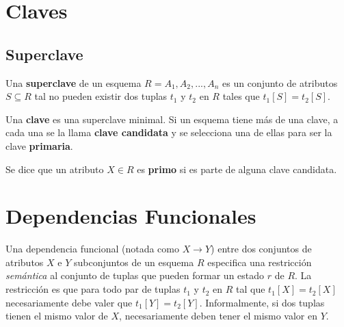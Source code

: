 \documentclass[]{article}
\begin{document}






\section{Claves}
\subsection{Superclave}
Una \textbf{superclave} de un esquema $R = {A_1, A_2, ..., A_n}$ es un conjunto de atributos $S\subseteq R$ tal no pueden existir dos tuplas $t_1$ y $t_2$ en $R$ tales que $t_1[S] = t_2[S]$.

Una \textbf{clave} es una superclave minimal. Si un esquema tiene más de una clave, a cada una se la llama \textbf{clave candidata} y se selecciona una de ellas para ser la clave \textbf{primaria}.

Se dice que un atributo $X \in R$ es \textbf{primo} si es parte de alguna clave candidata.

\section{Dependencias Funcionales}
Una dependencia funcional (notada como $X \rightarrow Y$) entre dos conjuntos de atributos $X$ e $Y$ subconjuntos de un esquema $R$ especifica una restricción \emph{semántica} al conjunto de tuplas que pueden formar un estado $r$ de $R$. La restricción es que para todo par de tuplas $t_1$ y $t_2$ en $R$ tal que $t_1[X] = t_2[X]$ necesariamente debe valer que $t_1[Y] = t_2[Y]$. Informalmente, si dos tuplas tienen el mismo valor de $X$, necesariamente deben tener el mismo valor en $Y$.
\end{document}

